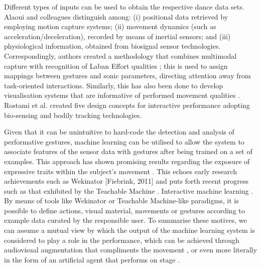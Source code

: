Different types of inputs can be used to obtain the respective dance data sets. Alaoui and colleagues \cite{fdili_alaoui_seeing_2017} distinguish among: (i) positional data retrieved by employing motion capture systems; (ii) movement dynamics (such as acceleration/deceleration), recorded by means of inertial sensors; and (iii) physiological information, obtained from biosignal sensor technologies. Correspondingly, authors created a methodology that combines multimodal capture with recognition of Laban Effort qualities \cite{fdili_alaoui_seeing_2017}; this is used to assign mappings between gestures and sonic parameters, directing attention away from task-oriented interactions. Similarly, this has also been done to develop visualisation systems that are informative of performed movement qualities \cite{alaoui_interactive_2015,hussain_evaluating_2019,jego_workflow_2019}. Rostami et al. \cite{rostami_bio-sensed_2017} created five design concepts for interactive performance adopting bio-sensing and bodily tracking technologies.

Given that it can be unintuitive to hard-code the detection and analysis of performative gestures, machine learning can be utilised to allow the system to associate features of the sensor data with gestures after being trained on a set of examples. This approach has shown promising results regarding the exposure of expressive traits within the subject's movement \cite{caramiaux_understanding_2015}. This echoes early research achievements such as Wekinator \cite{} [Fiebrink, 2011] and puts forth recent progress such as that exhibited by the Teachable Machine \cite{carney_teachable_2020}. Interactive machine learning \cite{fails_interactive_2003}. By means of tools like Wekinator or Teachable Machine-like paradigms, it is possible to define actions, visual material, movements or gestures according to example data curated by the responsible user.
To summarise these motives, we can assume a mutual view by which the output of the machine learning system is considered to play a role in the performance, which can be achieved through audiovisual augmentation that compliments the movement \cite{francoise_coda_2022}, or even more literally in the form of an artificial agent that performs on stage \cite{liapis_learning_2018}.

